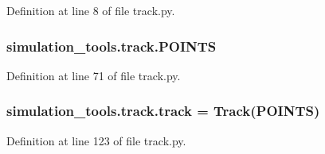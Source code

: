 Definition at line 8 of file track.\+py.

\subsubsection[{\texorpdfstring{P\+O\+I\+N\+TS}{POINTS}}]{\setlength{\rightskip}{0pt plus 5cm}simulation\+\_\+tools.\+track.\+P\+O\+I\+N\+TS}\hypertarget{namespacesimulation__tools_1_1track_ab9ddc4d3ba8bb81a3ce02320f46c8a55}{}\label{namespacesimulation__tools_1_1track_ab9ddc4d3ba8bb81a3ce02320f46c8a55}


Definition at line 71 of file track.\+py.

\subsubsection[{\texorpdfstring{track}{track}}]{\setlength{\rightskip}{0pt plus 5cm}simulation\+\_\+tools.\+track.\+track = {\bf Track}({\bf P\+O\+I\+N\+TS})}\hypertarget{namespacesimulation__tools_1_1track_ac731095c2502c445d46302406cb81651}{}\label{namespacesimulation__tools_1_1track_ac731095c2502c445d46302406cb81651}


Definition at line 123 of file track.\+py.

